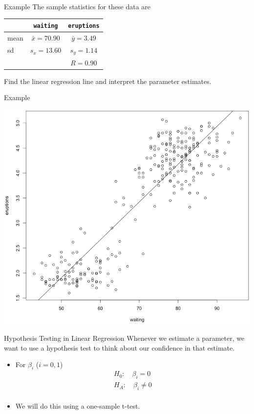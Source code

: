 \begin{frame}{Example}
    The sample statistics for these data are
    \begin{table}[]
        \centering
        \begin{tabular}{l cc}
            \hline
             & \texttt{waiting} & \texttt{eruptions} \\ \hline
            mean & $\bar{x}=70.90$ & $\bar{y}=3.49$ \\
            sd & $s_x=13.60$ & $s_y=1.14$ \\ \hline
            && $R = 0.90$ \\ \hline
        \end{tabular}
    \end{table}
    Find the linear regression line and interpret the parameter estimates.
\end{frame}

\begin{frame}{Example}
    \begin{center}
        \includegraphics[scale=0.25]{images/geysreg.png}
    \end{center}
\end{frame}

\begin{frame}{Hypothesis Testing in Linear Regression}
    Whenever we estimate a parameter, we want to use a hypothesis test to think about our confidence in that estimate.
    \begin{itemize}
        \item For $\beta_i$ ($i = 0,1$)
        \begin{align*}
            H_0: \quad \beta_i = 0 \\
            H_A: \quad \beta_i \ne 0 \\
        \end{align*}
        \item We will do this using a one-sample t-test.
    \end{itemize}
\end{frame}

